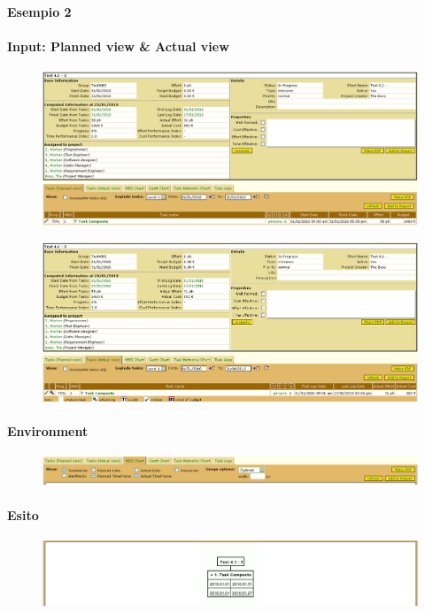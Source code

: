 \paragraph{Esempio 2}
\paragraph{Input: Planned view & Actual view}
\begin{figure}
\centering
\includegraphics[width=\textwidth]{tests/TEST_WBS/4.1/4.1_3/Esempio_2/input.png}
\end{figure}
\begin{figure}
\centering
\includegraphics[width=\textwidth]{tests/TEST_WBS/4.1/4.1_3/Esempio_2/input_actual.png}
\end{figure}

\paragraph{Environment}
\begin{figure}
\centering
\includegraphics[width=\textwidth]{tests/TEST_WBS/4.1/4.1_3/Esempio_2/environment.png}
\end{figure}

\paragraph{Esito}
\begin{figure}
\centering
\includegraphics[width=\textwidth]{tests/TEST_WBS/4.1/4.1_3/Esempio_2/output.png}
\end{figure}
\newpage


